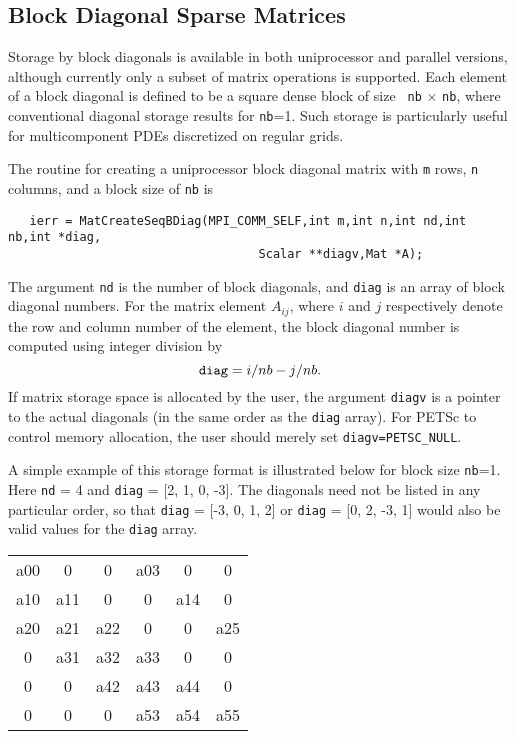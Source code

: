 \subsection{Block Diagonal Sparse Matrices}
\label{sec:bdiag}

Storage  by block diagonals is
available in both uniprocessor and parallel versions, although currently
only a subset of matrix operations is supported.  Each element of
a block diagonal is defined to be a square dense block of size {\tt
nb} $\times$ {\tt nb}, where conventional diagonal storage results for
{\tt nb}=1.  Such storage is particularly useful for multicomponent PDEs
discretized on regular grids.

The routine for creating a uniprocessor block diagonal matrix with {\tt m} 
rows, {\tt n} columns, and a block size of {\tt nb} is
\begin{verbatim}
   ierr = MatCreateSeqBDiag(MPI_COMM_SELF,int m,int n,int nd,int nb,int *diag,
                                   Scalar **diagv,Mat *A);
\end{verbatim}
The  argument {\tt nd} is the number of 
block diagonals, and {\tt diag} is
an array of block diagonal numbers.  For the matrix element $A_{ij}$,
where $i$ and $j$ respectively denote the row and column number of the 
element, the block diagonal number is computed using integer division by
\[ {\tt diag} = i/nb - j/nb. \]
If matrix storage space is allocated by the user, the argument {\tt diagv} 
is a pointer to the actual diagonals (in the same order as the {\tt diag} 
array).  For PETSc to control memory allocation, the user should merely
set {\tt diagv=PETSC\_NULL}.

A simple example of this storage format is illustrated below for block
size {\tt nb}=1. 
Here {\tt nd} = 4 and {\tt diag} = [2, 1, 0, -3]. The
diagonals need not be listed in any particular order, so that
{\tt diag} = [-3, 0, 1, 2] or {\tt diag} = [0, 2, -3, 1] would also
be valid values for the {\tt diag} array. 

\begin{center}
\begin{tabular}{| c c c c c c |}
\hline
a00  &0    &0    &a03  &0    &0\\
a10  &a11  &0    &0    &a14  &0\\
a20  &a21  &a22  &0    &0    &a25\\
0    &a31  &a32  &a33  &0    &0\\
0    &0    &a42  &a43  &a44  &0\\
0    &0    &0    &a53  &a54  &a55\\
\hline
\end{tabular}
\end{center}

